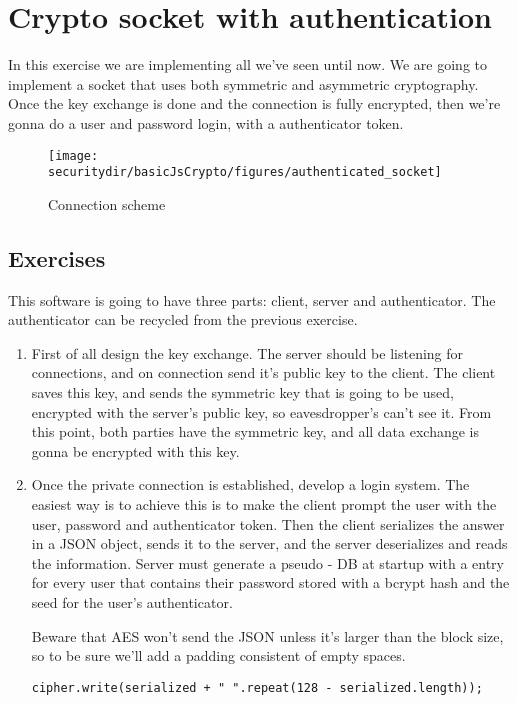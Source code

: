 \section{Crypto socket with authentication}

In this exercise we are implementing all we've seen until now. We are going to implement a socket that uses both symmetric and asymmetric cryptography. Once the key exchange is done and the connection is fully encrypted, then we're gonna do a user and password login, with a authenticator token.

\begin{figure}[htb]
	\begin{centering}
		\texttt{[image: \\securitydir/basicJsCrypto/figures/authenticated\_socket]}
		\par\end{centering}
	\caption{\label{fig:authenticated_socket} Connection scheme}
\end{figure}


\subsection{Exercises}
This software is going to have three parts: client, server and authenticator. The authenticator can be recycled from the previous exercise. 
\begin{enumerate}
	\item First of all design the key exchange. The server should be listening for connections, and on connection send it's public key to the client. The client saves this key, and sends the symmetric key that is going to be used, encrypted with the server's public key, so eavesdropper's can't see it. From this point, both parties have the symmetric key, and all data exchange is gonna be encrypted with this key.
	
	\item Once the private connection is established, develop a login system. The easiest way is to achieve this is to make the client prompt the user with the user, password and authenticator token. Then the client serializes the answer in a JSON object, sends it to the server, and the server deserializes and reads the information. Server must generate a pseudo - DB at startup with a entry for every user that contains their password stored with a bcrypt hash and the seed for the user's authenticator.
	
	Beware that AES won't send the JSON unless it's larger than the block size, so to be sure we'll add a padding consistent of empty spaces.
	
	\begin{lstlisting}[style=JavaScript]
	cipher.write(serialized + " ".repeat(128 - serialized.length));
	\end{lstlisting}
\end{enumerate}

